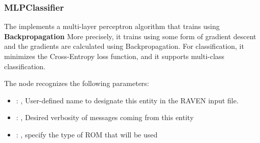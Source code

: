 \subsubsection{MLPClassifier}
  The  implements a multi-layer perceptron algorithm that trains using
  \textbf{Backpropagation}                             More precisely, it trains using some form of
  gradient descent and the gradients are calculated using Backpropagation.
  For classification, it minimizes the Cross-Entropy loss function, and it supports multi-class
  classification.                             

  The  node recognizes the following parameters:
    \begin{itemize}
      \item {}: ,
        User-defined name to designate this entity in the RAVEN input file.
      \item {}: ,
        Desired verbosity of messages coming from this entity
      \item {}: ,
        specify the type of ROM that will be used
  \end{itemize}


